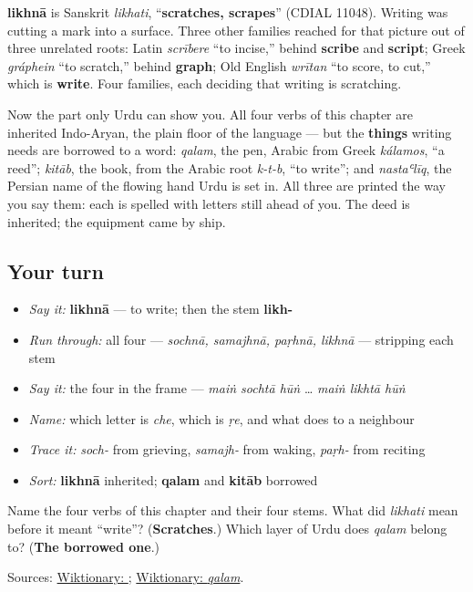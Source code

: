 \begin{cousinweb}
\textbf{likhnā} is Sanskrit \emph{likhati}, “\textbf{scratches, scrapes}” (CDIAL 11048). Writing was cutting a mark into a surface. Three other families reached for that picture out of three unrelated roots: Latin \emph{scrībere} “to incise,” behind \textbf{scribe} and \textbf{script}; Greek \emph{gráphein} “to scratch,” behind \textbf{graph}; Old English \emph{wrītan} “to score, to cut,” which is \textbf{write}. Four families, each deciding that writing is scratching.

Now the part only Urdu can show you. All four verbs of this chapter are inherited Indo-Aryan, the plain floor of the language — but the \textbf{things} writing needs are borrowed to a word: \emph{qalam}, the pen, Arabic from Greek \emph{kálamos}, “a reed”; \emph{kitāb}, the book, from the Arabic root \emph{k-t-b}, “to write”; and \emph{nastaʿlīq}, the Persian name of the flowing hand Urdu is set in. All three are printed the way you say them: each is spelled with letters still ahead of you. The deed is inherited; the equipment came by ship.
\end{cousinweb}

\subsection*{Your turn}
\begin{itemize}
\raggedright
  \item \emph{Say it:} \textbf{likhnā} — to write; then the stem \textbf{likh-}
  \item \emph{Run through:} all four — \emph{sochnā, samajhnā, paṛhnā, likhnā} — stripping each stem
  \item \emph{Say it:} the four in the frame — \emph{maiṅ sochtā hūṅ} … \emph{maiṅ likhtā hūṅ}
  \item \emph{Name:} which letter is \emph{che}, which is \emph{ṛe}, and what \textbf{} does to a neighbour
  \item \emph{Trace it:} \emph{soch-} from grieving, \emph{samajh-} from waking, \emph{paṛh-} from reciting
  \item \emph{Sort:} \textbf{likhnā} inherited; \textbf{qalam} and \textbf{kitāb} borrowed
\end{itemize}

\begin{tcolorbox}[breakable,colback=teal!4,colframe=teal!35!black,title={Before you move on}]
Name the four verbs of this chapter and their four stems. What did \emph{likhati} mean before it meant “write”? (\textbf{Scratches}.) Which layer of Urdu does \emph{qalam} belong to? (\textbf{The borrowed one}.)

Sources: \href{https://en.wiktionary.org/wiki/\%D9\%84\%DA\%A9\%DA\%BE\%D9\%86\%D8\%A7}{Wiktionary: }; \href{https://en.wiktionary.org/wiki/\%D9\%82\%D9\%84\%D9\%85\#Arabic}{Wiktionary: \emph{qalam}}.
\end{tcolorbox}
